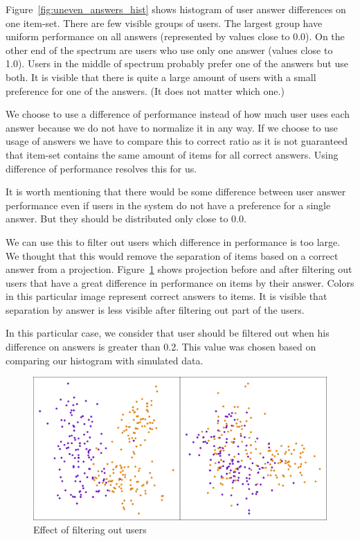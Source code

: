 \documentclass[
  printed, %
  table,   %
  nolof,     %
  nolot,     %
  color,
  final,
  nocover
]{fithesis3}
\begin{document}
Figure~\ref{fig:uneven_answers_hist} shows histogram of user answer differences on one item-set. There are few visible groups of users. The largest group have uniform performance on all answers (represented by values close to 0.0). On the other end of the spectrum are users who use only one answer (values close to 1.0). Users in the middle of spectrum probably prefer one of the answers but use both. It is visible that there is quite a large amount of users with a small preference for one of the answers. (It does not matter which one.)


We choose to use a difference of performance instead of how much user uses each answer because we do not have to normalize it in any way. If we choose to use usage of answers we have to compare this to correct ratio as it is not guaranteed that item-set contains the same amount of items for all correct answers. Using difference of performance resolves this for us.


It is worth mentioning that there would be some difference between user answer performance even if users in the system do not have a preference for a single answer. But they should be distributed only close to 0.0.

We can use this to filter out users which difference in performance is too large. We thought that this would remove the separation of items based on a correct answer from a projection. Figure~\ref{fig:answers_normalization} shows projection before and after filtering out users that have a great difference in performance on items by their answer. Colors in this particular image represent correct answers to items. It is visible that separation by answer is less visible after filtering out part of the users.

In this particular case, we consider that user should be filtered out when his difference on answers is greater than 0.2. This value was chosen based on comparing our histogram with simulated data.

\begin{figure}
  \includegraphics[width=\textwidth]{img/answers_normalization}
  \caption{Effect of filtering out users}
  \label{fig:answers_normalization}
\end{figure}
\end{document}
